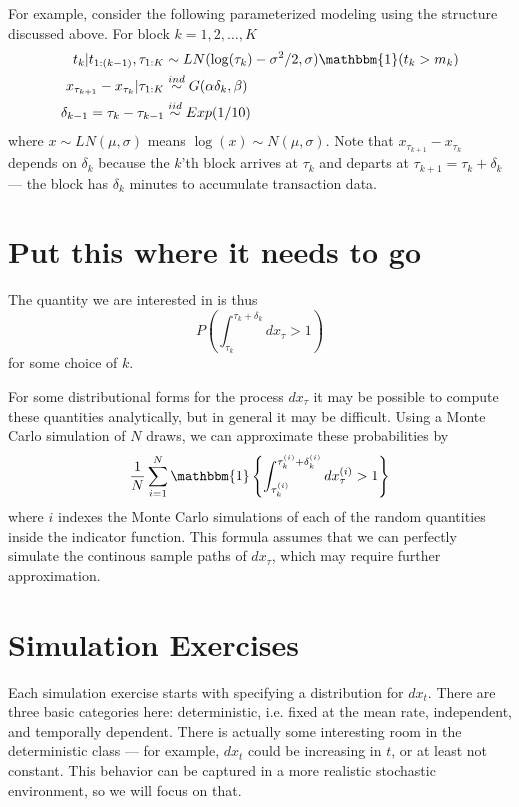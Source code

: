 \documentclass{article}
\begin{document}
For example, consider the following parameterized modeling using the structure discussed above. For block $k=1,2,\dots,K$
\begin{align*}
t_k|t_{1:(k-1)}, \tau_{1:K} &\sim LN(\log(\tau_k) - \sigma^2/2, \sigma)\mathbbm{1}(t_k > m_k)\\
x_{\tau_{k+1}} - x_{\tau_{k}}|\tau_{1:K} & \stackrel{ind}{\sim} G(\alpha\delta_k,\beta)\\
\delta_{k-1} = \tau_k - \tau_{k-1} &\stackrel{iid}{\sim} Exp(1/10)
\end{align*}
where $x\sim LN(\mu,\sigma)$ means $\log(x) \sim N(\mu,\sigma)$. Note that $x_{\tau_{k+1}} - x_{\tau_k}$ depends on $\delta_k$ because the $k$'th block arrives at $\tau_k$ and departs at $\tau_{k+1}=\tau_k + \delta_k$ --- the block has $\delta_k$ minutes to accumulate transaction data.


\section{Put this where it needs to go}

The quantity we are interested in is thus
\[
P\left(\int_{\tau_k}^{\tau_{k}+\delta_k}dx_\tau > 1\right)
\]
for some choice of $k$. 

For some distributional forms for the process $dx_\tau$ it may be possible to compute these quantities analytically, but in general it may be difficult. Using a Monte Carlo simulation of $N$ draws, we can approximate these probabilities by
\[
\frac{1}{N}\sum_{i=1}^N\mathbbm{1}\left\{\int_{\tau_k^{(i)}}^{\tau_{k}^{(i)}+\delta_k^{(i)}}dx_\tau^{(i)} > 1\right\}
\]
where $i$ indexes the Monte Carlo simulations of each of the random quantities inside the indicator function. This formula assumes that we can perfectly simulate the continous sample paths of $dx_\tau$, which may require further approximation.

\section{Simulation Exercises}

Each simulation exercise starts with specifying a distribution for $dx_t$. There are three basic categories here: deterministic, i.e. fixed at the mean rate, independent, and temporally dependent. There is actually some interesting room in the deterministic class --- for example, $dx_t$ could be increasing in $t$, or at least not constant. This behavior can be captured in a more realistic stochastic environment, so we will focus on that. 
\end{document}
